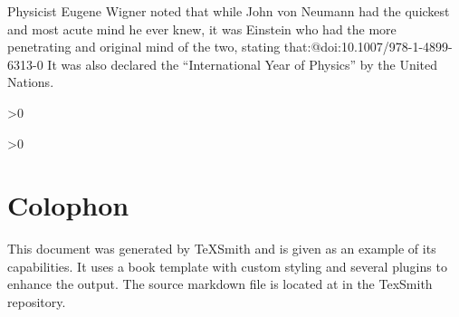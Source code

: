 \documentclass[twoside]{memoir}
\begin{document}
Physicist Eugene Wigner noted that while John von Neumann had the quickest and most acute mind he ever knew, it was Einstein who had the more penetrating and original mind of the two, stating that:@doi:10.1007/978-1-4899-6313-0 It was also declared the \enquote{International Year of Physics} by the United Nations.

\backmatter

\ifnum\value{figure}>0
\clearpage
\listoffigures
\fi
\ifnum\value{table}>0
\clearpage
\listoftables
\fi
\printglossary[type=\acronymtype]
\printindex
\printbibliography

\cleardoublepage
{}
{}
\chapter*{Colophon}
This document was generated by TeXSmith and is given as an example of its capabilities. It uses a book template with custom styling and several plugins to enhance the output. The source markdown file is located at  in the TexSmith repository.
\end{document}
